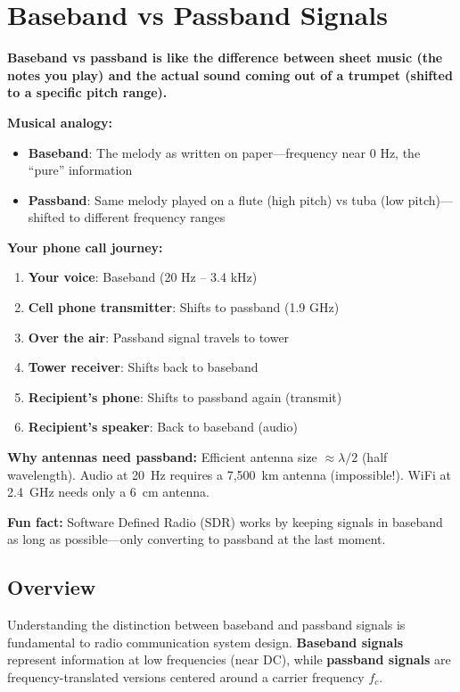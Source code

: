 \chapter{Baseband vs Passband Signals}
\label{ch:baseband-passband}

\begin{nontechnical}
\textbf{Baseband vs passband is like the difference between sheet music (the notes you play) and the actual sound coming out of a trumpet (shifted to a specific pitch range).}

\textbf{Musical analogy:}
\begin{itemize}
\item \textbf{Baseband}: The melody as written on paper---frequency near 0 Hz, the ``pure'' information
\item \textbf{Passband}: Same melody played on a flute (high pitch) vs tuba (low pitch)---shifted to different frequency ranges
\end{itemize}

\textbf{Your phone call journey:}
\begin{enumerate}
\item \textbf{Your voice}: Baseband (20 Hz -- 3.4 kHz)
\item \textbf{Cell phone transmitter}: Shifts to passband (1.9 GHz)
\item \textbf{Over the air}: Passband signal travels to tower
\item \textbf{Tower receiver}: Shifts back to baseband
\item \textbf{Recipient's phone}: Shifts to passband again (transmit)
\item \textbf{Recipient's speaker}: Back to baseband (audio)
\end{enumerate}

\textbf{Why antennas need passband:} Efficient antenna size $\approx \lambda/2$ (half wavelength). Audio at 20~Hz requires a 7,500~km antenna (impossible!). WiFi at 2.4~GHz needs only a 6~cm antenna.

\textbf{Fun fact:} Software Defined Radio (SDR) works by keeping signals in baseband as long as possible---only converting to passband at the last moment.
\end{nontechnical}

\section{Overview}

Understanding the distinction between baseband and passband signals is fundamental to radio communication system design. \textbf{Baseband signals} represent information at low frequencies (near DC), while \textbf{passband signals} are frequency-translated versions centered around a carrier frequency $f_c$.


